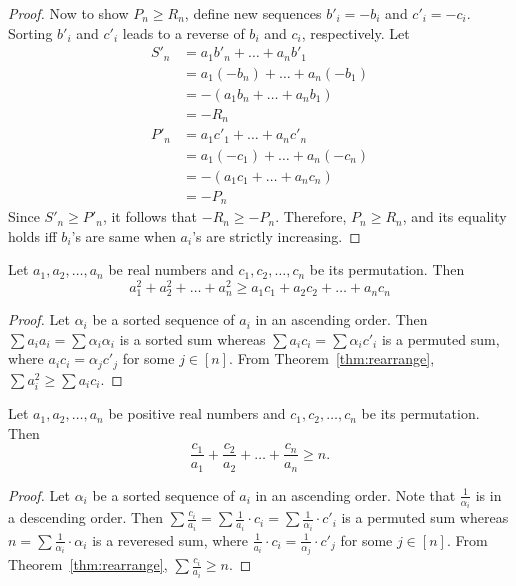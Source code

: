 \documentclass[../main.tex]{subfiles}
\begin{document}
\begin{proof}
    Now to show $P_n \geq R_n$, define new sequences $b'_i = -b_i$ and $c'_i = -c_i$.
    Sorting $b'_i$ and $c'_i$ leads to a reverse of $b_i$ and $c_i$, respectively.
    Let
    \begin{align*}
        S'_n &= a_1 b'_n + \dots + a_n b'_1\\
             &= a_1 (-b_n) + \dots + a_n (-b_1)\\
             &= -(a_1 b_n + \dots + a_n b_1)\\
             &= -R_n\\
        P'_n &= a_1 c'_1 + \dots + a_n c'_n\\
             &= a_1 (-c_1) + \dots + a_n (-c_n)\\
             &= -(a_1 c_1 + \dots + a_n c_n)\\
             &= -P_n
    \end{align*}
    Since $S'_n \geq P'_n$, it follows that $-R_n \geq -P_n$.
    Therefore, $P_n \geq R_n$, and its equality holds iff $b_i$'s are same when $a_i$'s are strictly increasing.
\end{proof}

\begin{cor} \label{cor:rearrange_1}
    Let $a_1, a_2, \dots, a_n$ be real numbers and $c_1, c_2, \dots, c_n$ be its permutation.
    Then
    \[
        a_1^2 + a_2^2 + \dots + a_n^2 \geq a_1 c_1 + a_2 c_2 + \dots + a_n c_n
    \]
\end{cor}
\begin{proof}
    Let $\alpha_i$ be a sorted sequence of $a_i$ in an ascending order.
    Then $\sum a_i a_i = \sum \alpha_i \alpha_i$ is a sorted sum whereas $\sum a_i c_i = \sum \alpha_i c'_i$ is a permuted sum, where $a_i c_i = \alpha_j c'_j$ for some $j \in [n]$.
    From Theorem~\ref{thm:rearrange}, $\sum a_i^2 \geq \sum a_i c_i$.
\end{proof}

\begin{cor} \label{cor:rearrange_2}
    Let $a_1, a_2, \dots, a_n$ be positive real numbers and $c_1, c_2, \dots, c_n$ be its permutation. 
    Then
    \[
        \frac{c_1}{a_1} + \frac{c_2}{a_2} + \dots + \frac{c_n}{a_n} \geq n.
    \]
\end{cor}
\begin{proof}
    Let $\alpha_i$ be a sorted sequence of $a_i$ in an ascending order.
    Note that $\frac{1}{\alpha_i}$ is in a descending order.
    Then $\sum \frac{c_i}{a_i} = \sum \frac{1}{a_i} \cdot c_i = \sum \frac{1}{\alpha_i} \cdot c'_i$ is a permuted sum whereas $n = \sum \frac{1}{\alpha_i} \cdot \alpha_i$ is a reveresed sum, where $\frac{1}{a_i} \cdot c_i = \frac{1}{\alpha_j} \cdot c'_j$ for some $j \in [n]$.
    From Theorem~\ref{thm:rearrange}, $\sum \frac{c_i}{a_i} \geq n$.
\end{proof}
\end{document}
